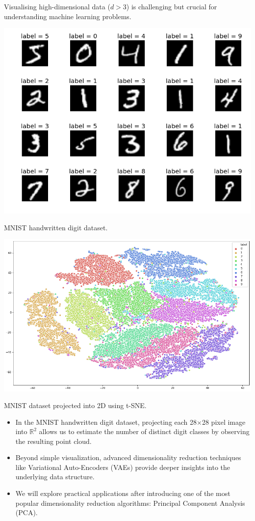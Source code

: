 Visualising high-dimensional data ($d > 3$) is challenging but crucial for understanding machine learning problems.
\begin{marginfigure}
    \centering
    \includegraphics[width=1\linewidth]{img/2_mnist.png}
    \caption{MNIST handwritten digit dataset.}
    \label{fig:mnist_}
\end{marginfigure}
\begin{marginfigure}
    \centering
    \includegraphics[width=1\linewidth]{img/2_mnist-tsne.png}
    \caption{MNIST dataset projected into 2D using t-SNE.}
    \label{fig:mnist_tsne}
\end{marginfigure}
\begin{itemize}
    \item In the MNIST handwritten digit dataset, projecting each 28$\times$28 pixel image into $\mathbb{R}^2$ allows us to estimate the number of distinct digit classes by observing the resulting point cloud.
    \item Beyond simple visualization, advanced dimensionality reduction techniques like Variational Auto-Encoders (VAEs) provide deeper insights into the underlying data structure.
    \item We will explore practical applications after introducing one of the most popular dimensionality reduction algorithms: Principal Component Analysis (PCA).
\end{itemize}

